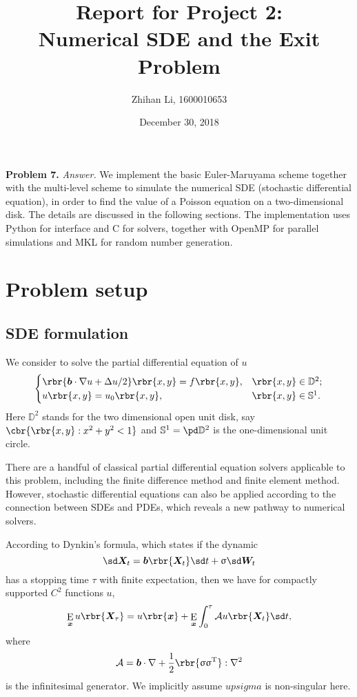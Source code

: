 \documentclass[english, nochinese]{pnote}
\title{Report for Project 2: \\ Numerical SDE and the Exit Problem}
\author{Zhihan Li, 1600010653}
\date{December 30, 2018}
\DeclareMathOperator\ope{\mathrm{E}}
\begin{document}
\maketitle

\textbf{Problem 7.} \textit{Answer.} We implement the basic Euler-Maruyama scheme together with the multi-level scheme to simulate the numerical SDE (stochastic differential equation), in order to find the value of a Poisson equation on a two-dimensional disk. The details are discussed in the following sections. The implementation uses Python for interface and C for solvers, together with OpenMP for parallel simulations and MKL for random number generation.

\section{Problem setup}

\subsection{SDE formulation}

We consider to solve the partial differential equation of $u$
\begin{equation} \label{Eq:PDE}
\begin{cases}
\rbr{ \bm{b} \cdot \nabla u + \Delta u / 2 } \rbr{ x, y } = f \rbr{ x, y }, & \rbr{ x, y } \in \mathbb{D}^2; \\
u \rbr{ x, y } = u_0 \rbr{ x, y }, & \rbr{ x, y } \in \mathbb{S}^1.
\end{cases}
\end{equation}
Here $\mathbb{D}^2$ stands for the two dimensional open unit disk, say $ \cbr{ \rbr{ x, y } : x^2 + y^2 < 1 } $ and $ \mathbb{S}^1 = \pd \mathbb{D}^2 $ is the one-dimensional unit circle.

There are a handful of classical partial differential equation solvers applicable to this problem, including the finite difference method and finite element method. However, stochastic differential equations can also be applied according to the connection between SDEs and PDEs, which reveals a new pathway to numerical solvers.

According to Dynkin's formula, which states if the dynamic
\begin{equation}
\sd \bm{X}_t = \bm{b} \rbr{\bm{X}_t} \sd t + \upsigma \sd \bm{W}_t
\end{equation}
has a stopping time $\tau$ with finite expectation, then we have for compactly supported $C^2$ functions $u$,
\begin{equation}
\ope_{\bm{x}} u \rbr{\bm{X}_{\tau}} = u \rbr{\bm{x}} + \ope_{\bm{x}} \int_0^{\tau} \mathcal{A} u \rbr{\bm{X}_t} \sd t,
\end{equation}
where
\begin{equation}
\mathcal{A} = \bm{b} \cdot \nabla + \frac{1}{2} \rbr{ \upsigma \upsigma^{\text{T}} } : \nabla^2
\end{equation}
is the infinitesimal generator. We implicitly assume $upsigma$ is non-singular here.
\end{document}
